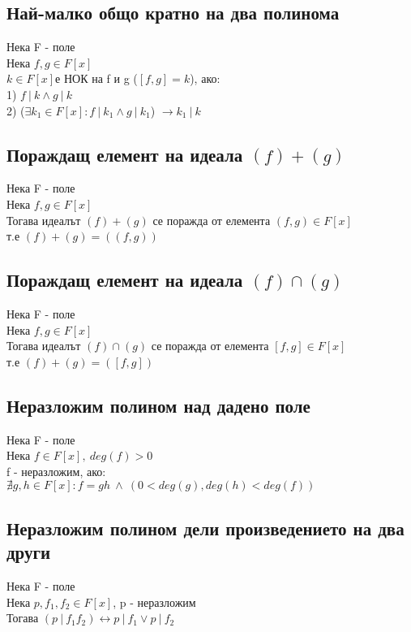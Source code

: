 \documentclass[12pt]{article}
\begin{document}
\subsection{Най-малко общо кратно на два полинома}
Нека F - поле \\
Нека $f,g \in F[x]$ \\
$k \in F[x]$е НОК на f и g ($[f,g] = k$), ако: \\
1) $f \ \vert \ k \land g \ \vert \ k$ \\
2) ($\exists k_1 \in F[x] : f \ \vert \ k_1 \land g \ \vert \ k_1$) $\rightarrow k_1 \ \vert \ k$

\subsection{Пораждащ елемент на идеала $(f) + (g)$}
Нека F - поле \\
Нека $f,g \in F[x]$ \\
Тогава идеалът $(f) + (g)$ се поражда от елемента $(f,g) \in F[x]$ \\
т.е  $(f) + (g) = ((f,g))$\\

\subsection{Пораждащ елемент на идеала $(f) \cap (g)$}
Нека F - поле \\
Нека $f,g \in F[x]$ \\
Тогава идеалът $(f) \cap (g)$ се поражда от елемента $[f,g] \in F[x]$ \\
т.е  $(f) + (g) = ([f,g])$\\

\subsection{Неразложим полином над дадено поле}
Нека F - поле \\
Нека $f \in F[x],\ deg(f) > 0$ \\
f - неразложим, ако: \\
$ \nexists g,h \in F[x] : f = gh\ \land\ (0 < deg(g),deg(h) < deg(f))$

\subsection{Неразложим полином дели произведението на два други}
Нека F - поле\\
Нека $p,f_1,f_2 \in F[x]$, p - неразложим \\
Тогава $(p \ \vert \ f_1f_2) \leftrightarrow p \ \vert \ f_1 \lor p \ \vert \ f_2$
\end{document}
